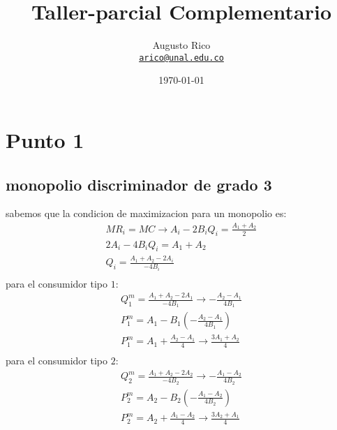 \documentclass[11pt]{article}
\title{Taller-parcial Complementario
}
\author{Augusto Rico\\
    \href{mailto:arico@unal.edu.co}{\texttt{arico@unal.edu.co}}}
\date{\today}
\begin{document}
\maketitle



\section{Punto 1}
\subsection{monopolio discriminador de grado 3}
\begin{flushleft}
    sabemos que la condicion de maximizacion para un monopolio es:
    \begin{align*}
        MR_i = MC \to 
        A_i-2B_iQ_i = \frac{A_1+A_2}{2}\\
        2A_i-4B_iQ_i = A_1+A_2\\
        Q_i=\frac{A_1+A_2-2A_i}{-4B_i}\\
    \end{align*}
    para el consumidor tipo $1$:
    \begin{align*}
        Q_1^m=\frac{A_1+A_2-2A_1}{-4B_1} \to -\frac{A_2-A_1}{4B_1}\\
        P^m_1=A_1-B_1\left(-\frac{A_2-A_1}{4B_1}\right)\\
        P^m_1=A_1+\frac{A_2-A_1}{4} \to \frac{3A_1+A_2}{4}\\
    \end{align*}
    para el consumidor tipo $2$:
    \begin{align*}
        Q_2^m=\frac{A_1+A_2-2A_2}{-4B_2} \to -\frac{A_1-A_2}{4B_2}\\
        P^m_2=A_2-B_2\left(-\frac{A_1-A_2}{4B_2}\right)\\
        P^m_2=A_2+\frac{A_1-A_2}{4} \to \frac{3A_2+A_1}{4}\\
    \end{align*}
\end{flushleft}
\end{document}
